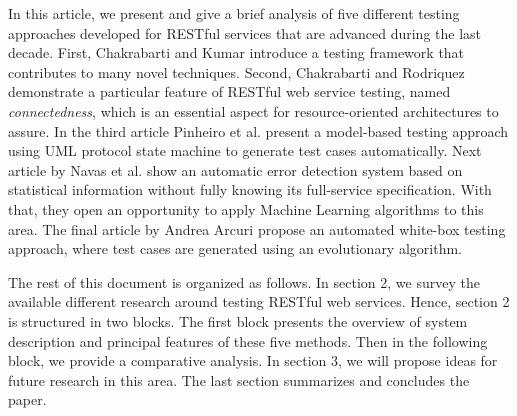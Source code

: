 \documentclass[english]{tktltiki}
\begin{document}
In this article, we present and give a brief analysis of five different testing approaches developed for RESTful services that are advanced during the last decade. First, Chakrabarti and Kumar \cite{chakrabarti2009test} introduce a testing framework that contributes to many novel techniques. Second, Chakrabarti and Rodriquez \cite{chakrabarti2010connectedness} demonstrate a particular feature of RESTful web service testing, named \textit{connectedness}, which is an essential aspect for resource-oriented architectures to assure. In the third article Pinheiro et al. \cite{pinheiro2013model} present a model-based testing approach using UML protocol state machine to generate test cases automatically. Next article by Navas et al. \cite{navas2014rest} show an automatic error detection system based on statistical information without fully knowing its full-service specification. With that, they open an opportunity to apply Machine Learning algorithms to this area. The final article by Andrea Arcuri \cite{arcuri2017restful} propose an automated white-box testing approach, where test cases are generated using an evolutionary algorithm.

The rest of this document is organized as follows. In section 2, we survey the available different research around testing RESTful web services. Hence, section 2 is structured in two blocks. The first block presents the overview of system description and principal features of these five methods. Then in the following block, we provide a comparative analysis. In section 3, we will propose ideas for future research in this area. The last section summarizes and concludes the paper.

\end{document}
